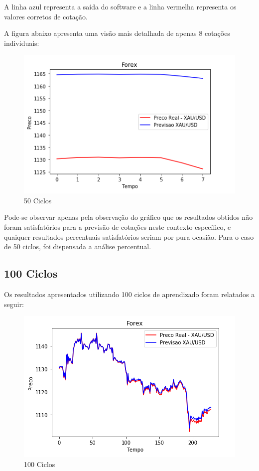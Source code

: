 A linha azul representa a saída do software e a linha vermelha representa os valores corretos de cotação.

A figura abaixo apresenta uma visão mais detalhada de apenas 8 cotações individuais:

\begin{figure}[h]
	\centering
	\includegraphics[keepaspectratio=true,scale=0.8]{figuras/50low.png}
	\caption{50 Ciclos}
	\label{fig16}
\end{figure}

Pode-se observar apenas pela observação do gráfico que os resultados obtidos não foram satisfatórios para a previsão de cotações neste
contexto específico, e quaiquer resultados percentuais satisfatórios seriam por pura ocasião. Para o caso de 50 ciclos, foi dispensada
a análise percentual.

\subsection[100 Ciclos]{100 Ciclos}

Os resultados apresentados utilizando 100 ciclos de aprendizado foram relatados a seguir:

\begin{figure}[h]
	\centering
	\includegraphics[keepaspectratio=true,scale=0.8]{figuras/100high.png}
	\caption{100 Ciclos}
	\label{fig17}
\end{figure}

